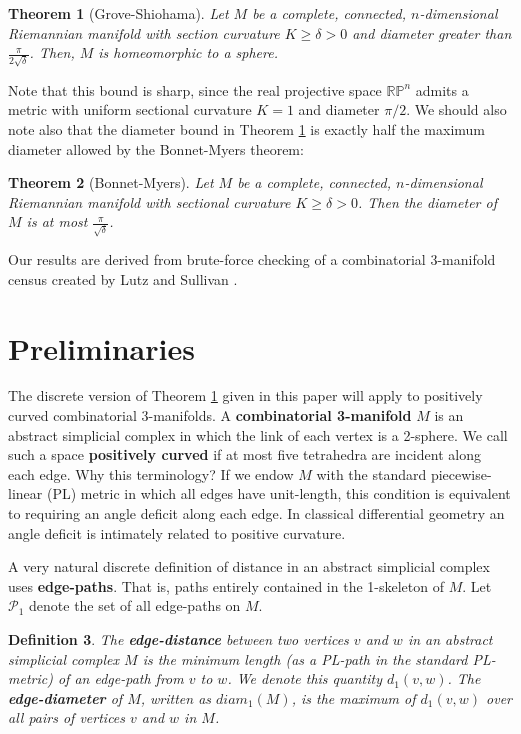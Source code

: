 \documentclass[12pt]{article}
\newtheorem{thm}{Theorem}[section]
\newtheorem{dfn}[thm]{Definition}
\begin{document}
\begin{thm}[Grove-Shiohama] Let $M$ be a complete, connected, $n$-dimensional Riemannian manifold with section curvature $K \geq \delta > 0$ and diameter greater than $\frac{\pi}{2\sqrt{\delta}}$. Then, $M$ is homeomorphic to a sphere.
\label{thm:grove_shiohama}
\end{thm}

\noindent Note that this bound is sharp, since the real projective space $\mathbb{RP}^n$ admits a metric with uniform sectional curvature $K=1$ and diameter $\pi/2$. We should also note also that the diameter bound in Theorem \ref{thm:grove_shiohama} is exactly half the maximum diameter allowed by the Bonnet-Myers theorem:

\begin{thm}[Bonnet-Myers] Let $M$ be a complete, connected, $n$-dimensional Riemannian manifold with sectional curvature $K \geq \delta > 0$. Then the diameter of $M$ is at most $\frac{\pi}{\sqrt{\delta}}$.
\label{thm:bonnet_myers}
\end{thm}

\noindent Our results are derived from brute-force checking of a combinatorial 3-manifold census created by Lutz and Sullivan \cite{LS}.

\section{Preliminaries}
\label{sect:basics}

The discrete version of Theorem \ref{thm:grove_shiohama} given in this paper will apply to positively curved combinatorial 3-manifolds. A \textbf{combinatorial 3-manifold} $M$ is an abstract simplicial complex in which the link of each vertex is a 2-sphere. We call such a space \textbf{positively curved} if at most five tetrahedra are incident along each edge. Why this terminology? If we endow $M$ with the standard piecewise-linear (PL) metric in which all edges have unit-length, this condition is equivalent to requiring an angle deficit along each edge. In classical differential geometry an angle deficit is intimately related to positive curvature.

A very natural discrete definition of distance in an abstract simplicial complex uses \textbf{edge-paths}. That is, paths entirely contained in the 1-skeleton of $M$. Let $\mathcal{P}_1$ denote the set of all edge-paths on $M$.

\begin{dfn}The \textbf{edge-distance} between two vertices $v$ and $w$ in an abstract simplicial complex $M$ is the minimum length (as a PL-path in the standard PL-metric) of an edge-path from $v$ to $w$. We denote this quantity $d_1(v,w)$. The \textbf{edge-diameter} of $M$, written as $diam_1(M)$, is the maximum of $d_1(v,w)$ over all pairs of vertices $v$ and $w$ in $M$. 
\end{dfn}
\end{document}
